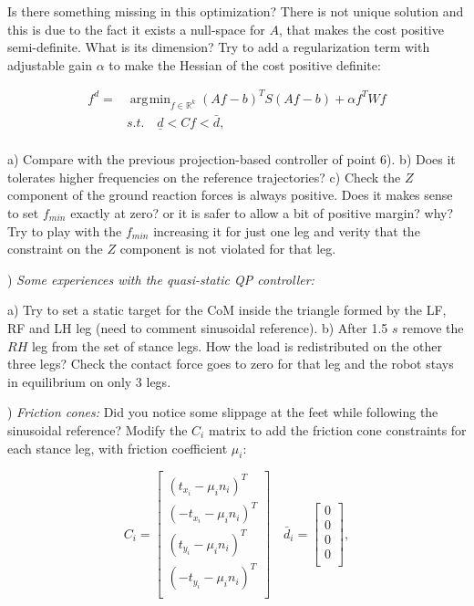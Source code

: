 \documentclass[11pt]{article}
\newcommand{\Rnum}{\mathbb{R}} %
\DeclareMathOperator*{\argmin}{\arg\!\min}				%
\begin{document}
Is there something missing in this optimization? There is not unique solution and this is due to the fact it exists a null-space  for $A$, that makes the cost positive semi-definite. What is its dimension?  Try to add a regularization term with adjustable gain $\alpha$ to make the 
Hessian of the cost positive definite:

\begin{equation} 
\begin{aligned} 
f^d = & \argmin_{f \in \Rnum^k} (Af-b)^T S (Af-b) + \alpha f^T W f\\
& s.t. \quad \underline{d} < C f < \bar{d},\\
\end{aligned} 
\label{eq:min_prob}
\end{equation}

a) Compare with the previous projection-based controller of point 6). 
b) Does it tolerates higher frequencies on the reference trajectories?
c) Check the $Z$ component of the ground reaction forces is always positive. Does it makes sense to set $f_{min}$ exactly at zero? or it is safer to allow a bit of positive margin? why?
 Try to play with the $f_{min}$ increasing it for just one leg and verity that the constraint on the $Z$ component is not violated for that leg.

\quad

) \textit{Some experiences with the quasi-static QP controller:}

a) Try to set a static target for the CoM inside the triangle formed by the LF, RF and LH leg (need to comment sinusoidal reference).
b) After 1.5 $s$ remove the  $RH$ leg from the set of stance legs. How the load is redistributed on the other three legs? Check the contact force goes to zero for that leg and the robot stays in equilibrium on only 3 legs.

\quad

) \textit{Friction cones:}
Did you notice  some slippage at the feet while following the sinusoidal reference?
Modify the $C_i$ matrix to add the friction cone constraints for each stance leg, with friction coefficient $\mu_i$:

\begin{equation}
C_i = \left[ \begin{matrix} 
(t_{x_i} -\mu_i n_i)^T \\
(-t_{x_i} -\mu_i n_i)^T \\
(t_{y_i} -\mu_i n_i)^T \\
(-t_{y_i} -\mu_i n_i)^T \\
\end{matrix}\right] 
\quad
\bar{d}_i = \left[ \begin{matrix} 
0 \\
0 \\ 
0 \\
0\\
\end{matrix}\right],
\label{eq:inequality_matrix}
\end{equation}
\end{document}
